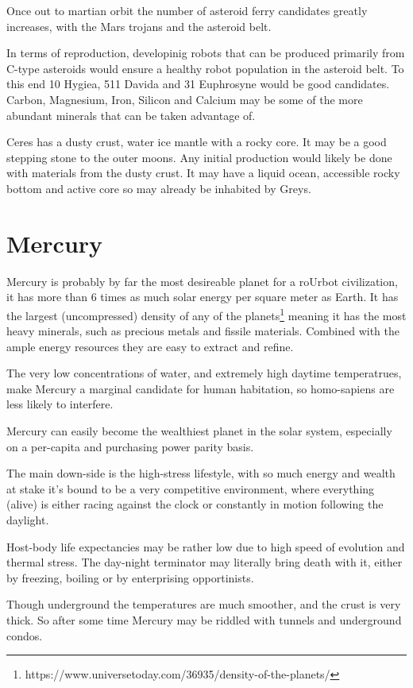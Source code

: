 Once out to martian orbit the number of asteroid ferry candidates greatly 
increases, with the Mars trojans and the asteroid belt.

In terms of reproduction, developinig robots that can be produced primarily 
from C-type asteroids would ensure a healthy robot population in the asteroid
belt. To this end 10 Hygiea, 511 Davida and 31 Euphrosyne would be good 
candidates. Carbon, Magnesium, Iron, Silicon and Calcium may be some of the more
abundant minerals that can be taken advantage of.

Ceres has a dusty crust,  water ice mantle with a rocky core. It may be a 
good stepping stone to the outer moons. Any initial production
would likely be done with materials from the dusty crust. It may have a liquid
ocean, accessible rocky bottom and active core so may already be 
inhabited by Greys. 

\section{Mercury}
Mercury is probably by far the most desireable planet for a roUrbot civilization, 
it has more than 6 times as much solar energy per square meter as Earth. 
It has the largest (uncompressed) density of any of the
planets\footnote{https://www.universetoday.com/36935/density-of-the-planets/}
meaning it has the most heavy minerals, 
such as precious metals and fissile materials.  Combined with the ample energy
resources they are easy to extract and refine. 

The very low concentrations of water, and extremely high daytime temperatrues,
 make Mercury a marginal candidate for human habitation, so homo-sapiens are
less likely to interfere.

Mercury can easily become the wealthiest planet in the solar system, especially
on a per-capita and purchasing power parity basis. 

The main down-side is the high-stress lifestyle, with so much energy and wealth
at stake it's bound to be a very competitive environment, where everything
(alive) is either racing against the clock or constantly in motion following the
daylight.

Host-body life expectancies may be rather low due to high speed of evolution
 and thermal stress. The day-night terminator may literally bring death with it,
either by freezing, boiling or by enterprising opportinists.

Though underground the temperatures are much smoother, and the crust is very
thick.  So after some time Mercury may be riddled with tunnels and underground
condos. 

